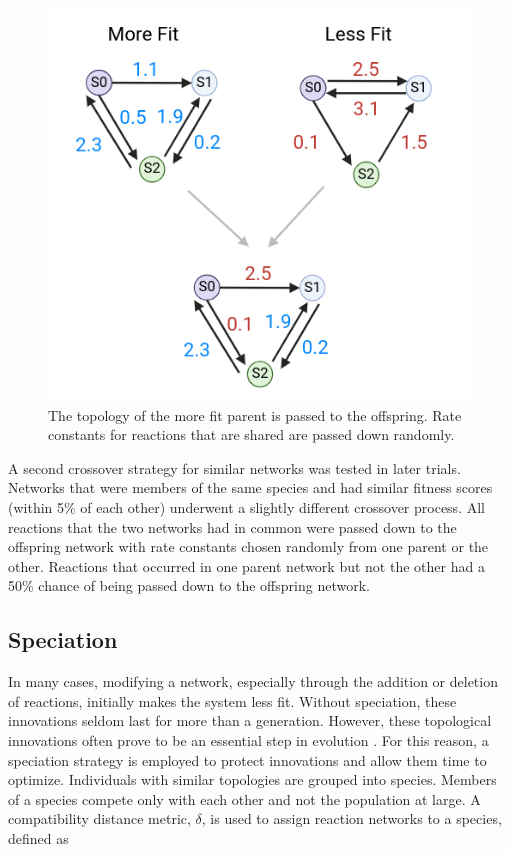 \documentclass[12pt]{report}
\begin{document}
\begin{figure}
	\centering
    \includegraphics[width=12cm]{images/crossover_example.png}
    \caption[Crossover example]{The topology of the more fit parent is passed to the offspring. Rate constants for reactions that are shared are passed down randomly.}
    \label{figure:crossover_example}
\end{figure}


A second crossover strategy for similar networks was tested in later trials. Networks that were members of the same species and had similar fitness scores (within 5\% of each other) underwent a slightly different crossover process. All reactions that the two networks had in common were passed down to the offspring network with rate constants chosen randomly from one parent or the other. Reactions that occurred in one parent network but not the other had a 50\% chance of being passed down to the offspring network.

\subsection{Speciation}
In many cases, modifying a network, especially through the addition or deletion of reactions, initially makes the system less fit. Without speciation, these innovations seldom last for more than a generation. However, these topological innovations often prove to be an essential step in evolution \cite{stanley_evolving_2002}. For this reason, a speciation strategy is employed to protect innovations and allow them time to optimize. Individuals with similar topologies are grouped into species. Members of a species compete only with each other and not the population at large.  A compatibility distance metric, $\delta$, is used to assign reaction networks to a species, defined as
\end{document}
